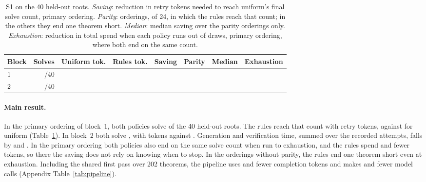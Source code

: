 \begin{table}[t]
\caption{S1 on the 40 held-out roots.  \emph{Saving}: reduction in retry tokens needed to reach uniform's final solve count, primary ordering.  \emph{Parity}: orderings, of 24, in which the rules reach that count; in the others they end one theorem short.  \emph{Median}: median saving over the parity orderings only.  \emph{Exhaustion}: reduction in total spend when each policy runs out of draws, primary ordering, where both end on the same count.}
\label{tab:scheduler-main}
\centering\small
\begin{tabular}{lrrrrrrr}
\toprule
Block & Solves & Uniform tok. & Rules tok. & Saving & Parity & Median & Exhaustion \\
\midrule
1 & \SchedBOneSolves{}/40 & \SchedBOneTokensUniform{} & \SchedBOneTokensRules{} & \SchedBOneSavings{} & \SchedBOneParity{} & \SchedBOneOrderMedian{} & \SchedBOneExhaustSavings{} \\
2 & \SchedBTwoSolves{}/40 & \SchedBTwoTokensUniform{} & \SchedBTwoTokensRules{} & \SchedBTwoSavings{} & \SchedBTwoParity{} & \SchedBTwoOrderMedian{} & \SchedBTwoExhaustSavings{} \\
\bottomrule
\end{tabular}
\end{table}

\paragraph{Main result.}
In the primary ordering of block~1, both policies solve \SchedBOneSolves{} of the 40 held-out roots.  The rules reach that count with \SchedBOneTokensRules{} retry tokens, against \SchedBOneTokensUniform{} for uniform (Table~\ref{tab:scheduler-main}).  In block~2 both solve \SchedBTwoSolves{}, with \SchedBTwoTokensRules{} tokens against \SchedBTwoTokensUniform{}.  Generation and verification time, summed over the recorded attempts, falls by \SchedTimeBOne{} and \SchedTimeBTwo{}.  In the primary ordering both policies also end on the same solve count when run to exhaustion, and the rules spend \SchedBOneExhaustSavings{} and \SchedBTwoExhaustSavings{} fewer tokens, so there the saving does not rely on knowing when to stop.  In the orderings without parity, the rules end one theorem short even at exhaustion.  Including the shared first pass over 202 theorems, the pipeline uses \SchedPipelineOneSavings{} and \SchedPipelineTwoSavings{} fewer completion tokens and makes \SchedPipelineOneCallsAvoided{} and \SchedPipelineTwoCallsAvoided{} fewer model calls (Appendix Table~\ref{tab:pipeline}).

